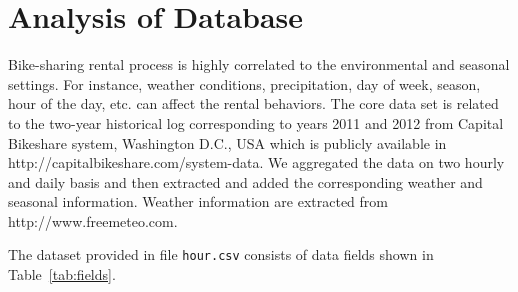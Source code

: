 \section{Analysis of Database}
\label{sec:database}
Bike-sharing rental process is highly correlated to the environmental and seasonal settings. For instance, weather conditions,
precipitation, day of week, season, hour of the day, etc. can affect the rental behaviors. The core data set is related to
the two-year historical log corresponding to years 2011 and 2012 from Capital Bikeshare system, Washington D.C., USA which is
publicly available in http://capitalbikeshare.com/system-data. We aggregated the data on two hourly and daily basis and then
extracted and added the corresponding weather and seasonal information. Weather information are extracted from http://www.freemeteo.com.

The dataset provided in file \texttt{hour.csv} consists of data fields shown in Table~\ref{tab:fields}.

